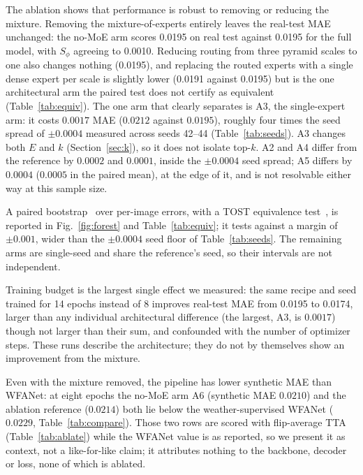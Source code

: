 \documentclass[10pt,a4paper,twocolumn,twoside]{article}
\begin{document}
The ablation shows that performance is robust to removing or reducing the mixture.
Removing the mixture-of-experts entirely leaves the real-test MAE unchanged: the
no-MoE arm scores 0.0195 on real test against 0.0195 for the full model, with $S_\phi$
agreeing to 0.0010. Reducing routing from three pyramid scales to one also changes nothing
(0.0195), and replacing the routed experts with a single dense expert per scale is slightly
lower (0.0191 against 0.0195) but is the one architectural arm the paired test does not certify
as equivalent (Table~\ref{tab:equiv}). The one arm that clearly separates is A3, the
single-expert arm: it costs $0.0017$ MAE
($0.0212$ against $0.0195$), roughly four times the seed spread of $\pm0.0004$ measured across
seeds 42--44 (Table~\ref{tab:seeds}). A3 changes both $E$ and $k$ (Section~\ref{sec:k}), so it does not isolate top-$k$. A2 and A4 differ from the reference by $0.0002$ and $0.0001$, inside the $\pm0.0004$ seed spread; A5 differs by $0.0004$ ($0.0005$ in the paired mean), at the edge of it, and is not resolvable either way at this sample size.

A paired bootstrap~\cite{efron1993bootstrap} over
per-image errors, with a TOST equivalence test~\cite{schuirmann1987tost,lakens2017equivalence}, is reported in Fig.~\ref{fig:forest} and Table~\ref{tab:equiv}; it tests
against a margin of $\pm0.001$, wider than the $\pm0.0004$ seed floor of
Table~\ref{tab:seeds}. The remaining arms are single-seed and share the reference's seed, so
their intervals are not independent.

Training budget is the largest single effect we measured: the
same recipe and seed trained for 14 epochs instead of 8 improves real-test MAE from 0.0195
to 0.0174, larger than any individual architectural difference (the largest, A3, is $0.0017$)
though not larger than their sum, and confounded with the number of optimizer steps.
These runs describe the architecture; they do not by themselves show an improvement from the mixture.

Even with the mixture removed, the pipeline has lower synthetic MAE than WFANet: at eight
epochs the no-MoE arm A6 (synthetic MAE $0.0210$) and the ablation reference ($0.0214$)
both lie below the weather-supervised WFANet ($0.0229$, Table~\ref{tab:compare}). Those two
rows are scored with flip-average TTA (Table~\ref{tab:ablate}) while the WFANet value is as
reported, so we present it as context, not a like-for-like claim; it attributes
nothing to the backbone, decoder or loss, none of which is ablated.
\end{document}

